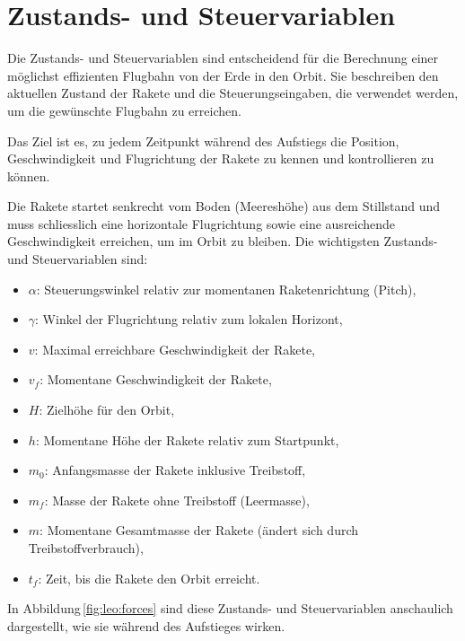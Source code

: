 %
%
%
%

\section{Zustands- und Steuervariablen \label{leo:section:variabeln}}

Die Zustands- und Steuervariablen sind entscheidend für die Berechnung
einer möglichst effizienten Flugbahn von der Erde in den Orbit.
Sie beschreiben den aktuellen Zustand der Rakete und die
Steuerungseingaben, die verwendet werden, um die gewünschte Flugbahn
zu erreichen.

Das Ziel ist es, zu jedem Zeitpunkt während des Aufstiegs die Position, Geschwindigkeit und Flugrichtung der Rakete zu kennen und kontrollieren zu können. 

Die Rakete startet senkrecht vom Boden (Meereshöhe) aus dem Stillstand und muss schliesslich eine horizontale Flugrichtung sowie eine ausreichende Geschwindigkeit erreichen, um im Orbit zu bleiben. 
Die wichtigsten Zustands- und Steuervariablen sind:
\begin{itemize}
	\item \(\alpha\): Steuerungswinkel relativ zur momentanen Raketenrichtung (Pitch),
%
	\item \(\gamma\): Winkel der Flugrichtung relativ zum lokalen Horizont,
	\item \(v\): Maximal erreichbare Geschwindigkeit der Rakete,
	\item \(v_f\): Momentane Geschwindigkeit der Rakete,
	\item \(H\): Zielhöhe für den Orbit,
	\item \(h\): Momentane Höhe der Rakete relativ zum Startpunkt,
	\item \(m_0\): Anfangsmasse der Rakete inklusive Treibstoff,
	\item \(m_f\): Masse der Rakete ohne Treibstoff (Leermasse),
%
	\item \(m\): Momentane Gesamtmasse der Rakete (ändert sich durch Treibstoffverbrauch),
	\item \(t_f\): Zeit, bis die Rakete den Orbit erreicht.
\end{itemize}
\noindent In Abbildung\,\ref{fig:leo:forces} sind diese Zustands-
und Steuervariablen anschaulich dargestellt, wie sie während des
Aufstieges wirken.

